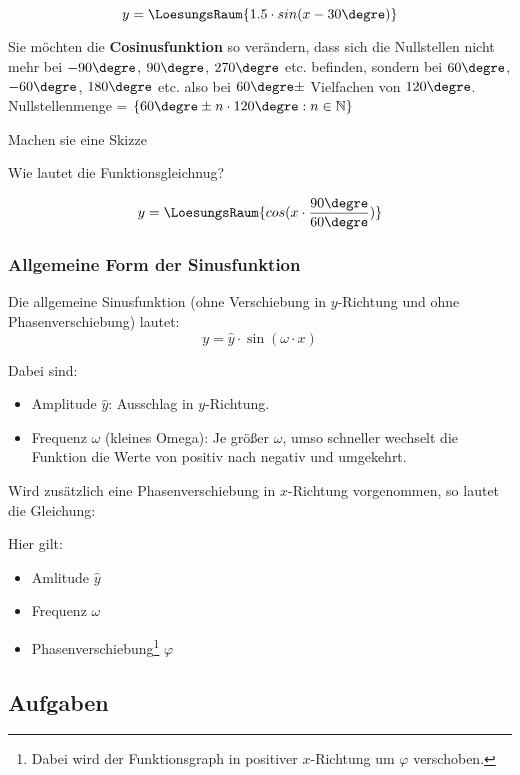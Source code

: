 $$y = \LoesungsRaum{1.5 \cdot{} sin(x - 30\degre)}$$


Sie möchten die \textbf{Cosinusfunktion} so verändern, dass sich die
Nullstellen nicht mehr bei $-90\degre$, $90\degre$, $270\degre$
etc. befinden, sondern bei $60\degre$, $-60\degre$, $180\degre$
etc. also bei $60\degre \pm$ Vielfachen von
$120\degre$. Nullstellenmenge = $\{60\degre\pm n\cdot{}120\degre:
n\in\mathbb{N}\}$

Machen sie eine Skizze

\trigsysD{}

Wie lautet die Funktionsgleichnug?

$$y = \LoesungsRaum{cos(x\cdot\frac{90\degre}{60\degre})}$$
\newpage




\subsubsection{Allgemeine Form der Sinusfunktion}

Die allgemeine Sinusfunktion (ohne Verschiebung in $y$-Richtung und
ohne Phasenverschiebung) lautet:
$$y=\hat{y}\cdot{}\sin(\omega\cdot{}x)$$

Dabei sind:
\begin{itemize}

\item
  Amplitude $\hat{y}$: Ausschlag in $y$-Richtung.
\item
  Frequenz $\omega$ (kleines Omega): Je größer $\omega$, umso schneller wechselt die
  Funktion die Werte von positiv nach negativ und umgekehrt.
\end{itemize}

Wird zusätzlich eine Phasenverschiebung in $x$-Richtung vorgenommen, so lautet die Gleichung:

\begin{center}
  \end{center}

Hier gilt:
\begin{itemize}

\item
  Amlitude $\hat{y}$
\item
  Frequenz $\omega$
\item
  Phasenverschiebung\footnote{Dabei wird der Funktionsgraph in positiver $x$-Richtung um
    $\varphi$ verschoben.} $\varphi$
\end{itemize}


\subsection*{Aufgaben}
